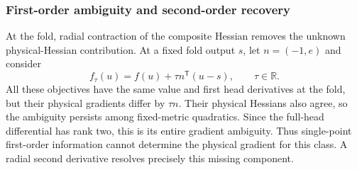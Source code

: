 \documentclass[pdflatex,sn-mathphys-num]{sn-jnl}
\begin{document}
\subsubsection{First-order ambiguity and second-order recovery}
At the fold, radial contraction of the composite Hessian removes the unknown physical-Hessian contribution. At a fixed fold output $s$, let $n=(-1,e)$ and consider
\begin{equation}
 f_\tau(u)=f(u)+\tau n^{\mathsf T}(u-s),\qquad \tau\in\mathbb R.
 \label{eq:ambiguity}
\end{equation}
All these objectives have the same value and first head derivatives at the fold, but their physical gradients differ by $\tau n$. Their physical Hessians also agree, so the ambiguity persists among fixed-metric quadratics. Since the full-head differential has rank two, this is its entire gradient ambiguity. Thus single-point first-order information cannot determine the physical gradient for this class. A radial second derivative resolves precisely this missing component.
\end{document}
